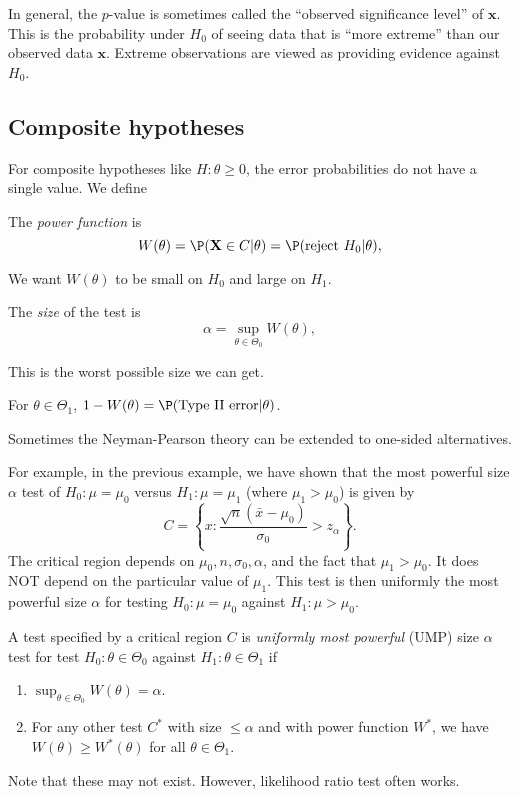 \documentclass[a4paper]{article}
\begin{document}
In general, the $p$-value is sometimes called the ``observed significance level'' of $\mathbf{x}$. This is the probability under $H_0$ of seeing data that is ``more extreme'' than our observed data $\mathbf{x}$. Extreme observations are viewed as providing evidence against $H_0$.

\subsection{Composite hypotheses}
For composite hypotheses like $H:\theta \geq 0$, the error probabilities do not have a single value. We define
\begin{defi}
  The \emph{power function} is
  \[
    W(\theta) = \P(\mathbf{X}\in C|\theta) = \P(\text{reject }H_0|\theta),
  \]
\end{defi}
We want $W(\theta)$ to be small on $H_0$ and large on $H_1$.

\begin{defi}[Size]
  The \emph{size} of the test is
  \[
    \alpha =\sup_{\theta\in \Theta_0}W(\theta),
  \]
\end{defi}
This is the worst possible size we can get.

For $\theta\in \Theta_1$, $1 - W(\theta) = \P(\text{Type II error}|\theta)$.

Sometimes the Neyman-Pearson theory can be extended to one-sided alternatives.

For example, in the previous example, we have shown that the most powerful size $\alpha$ test of $H_0: \mu = \mu_0$ versus $H_1: \mu = \mu_1$ (where $\mu_1 > \mu_0$) is given by
\[
  C = \left\{x: \frac{\sqrt{n}(\bar x - \mu_0)}{\sigma_0} >  z_\alpha\right\}.
\]
The critical region depends on $\mu_0, n, \sigma_0, \alpha$, and the fact that $\mu_1 > \mu_0$. It does NOT depend on the particular value of $\mu_1$. This test is then uniformly the most powerful size $\alpha$ for testing $H_0: \mu = \mu_0$ against $H_1: \mu> \mu_0$.

\begin{defi}
  A test specified by a critical region $C$ is \emph{uniformly most powerful} (UMP) size $\alpha$ test for test $H_0:\theta\in \Theta_0$ against $H_1: \theta \in \Theta_1$ if
  \begin{enumerate}
    \item $\sup_{\theta\in \Theta_0} W(\theta) = \alpha$.
    \item For any other test $C^*$ with size $\leq \alpha$ and with power function $W^*$, we have $W(\theta) \geq W^*(\theta)$ for all $\theta\in \Theta_1$.
  \end{enumerate}
  Note that these may not exist. However, likelihood ratio test often works.
\end{defi}
\end{document}
